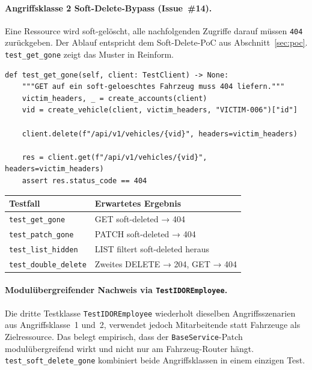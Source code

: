 \paragraph{Angriffsklasse 2 \textendash{} Soft-Delete-Bypass (Issue~\#14).}
Eine Ressource wird soft-gelöscht, alle nachfolgenden Zugriffe darauf
müssen \texttt{404} zurückgeben. Der Ablauf entspricht dem
Soft-Delete-PoC aus Abschnitt~\ref{sec:poc}. \texttt{test\_get\_gone}
zeigt das Muster in Reinform.

\begin{lstlisting}[style=custompython, caption={\texttt{TestSoftDeleteBypass.test\_get\_gone} \textendash{} Lookup per direkter UUID nach dem Soft-Delete.}]
def test_get_gone(self, client: TestClient) -> None:
    """GET auf ein soft-geloeschtes Fahrzeug muss 404 liefern."""
    victim_headers, _ = create_accounts(client)
    vid = create_vehicle(client, victim_headers, "VICTIM-006")["id"]

    client.delete(f"/api/v1/vehicles/{vid}", headers=victim_headers)

    res = client.get(f"/api/v1/vehicles/{vid}", headers=victim_headers)
    assert res.status_code == 404
\end{lstlisting}

\begin{center}
      \begin{tabular}{|l|l|}
            \hline
            \textbf{Testfall}             & \textbf{Erwartetes Ergebnis}     \\
            \hline
            \texttt{test\_get\_gone}      & GET soft-deleted → 404           \\
            \texttt{test\_patch\_gone}    & PATCH soft-deleted → 404         \\
            \texttt{test\_list\_hidden}   & LIST filtert soft-deleted heraus \\
            \texttt{test\_double\_delete} & Zweites DELETE → 204, GET → 404  \\
            \hline
      \end{tabular}
\end{center}

\paragraph{Modulübergreifender Nachweis via \texttt{TestIDOREmployee}.}
Die dritte Testklasse \texttt{TestIDOREmployee} wiederholt dieselben
Angriffsszenarien aus Angriffsklasse~1 und~2, verwendet jedoch
Mitarbeitende statt Fahrzeuge als Zielressource. Das belegt empirisch,
dass der \texttt{BaseService}-Patch modulübergreifend wirkt und nicht
nur am Fahrzeug-Router hängt. \texttt{test\_soft\_delete\_gone}
kombiniert beide Angriffsklassen in einem einzigen Test.

